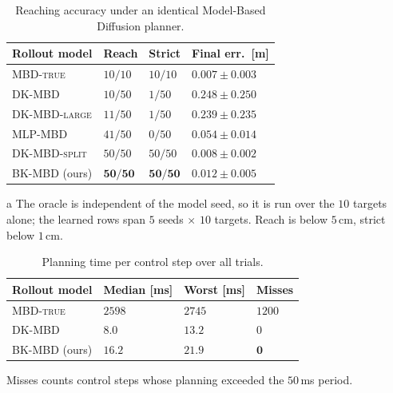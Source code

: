 \documentclass[letterpaper,10pt,conference]{ieeeconf}
\newcommand{\mbdtrue}{\textsc{MBD-true}}
\newcommand{\dkmbd}{\textsc{DK-MBD}}
\newcommand{\dksplit}{\textsc{DK-MBD-split}}
\newcommand{\bkmbd}{\textsc{BK-MBD}}
\begin{document}
\begin{table}[t]
\centering
\begin{threeparttable}
\caption{Reaching accuracy under an identical Model-Based Diffusion planner.}
\label{tab:franka}
\footnotesize
\setlength{\tabcolsep}{4pt}
\begin{tabularx}{\linewidth}{l Y Y Y}
\toprule
Rollout model & Reach & Strict & Final err.\ [m] \\
\midrule
\mbdtrue{} & $10/10$ & $10/10$ & $0.007{\pm}0.003$ \\
\dkmbd{} & $10/50$ & $1/50$ & $0.248{\pm}0.250$ \\
\textsc{DK-MBD-large} & $11/50$ & $1/50$ & $0.239{\pm}0.235$ \\
\textsc{MLP-MBD} & $41/50$ & $0/50$ & $0.054{\pm}0.014$ \\
\dksplit{} & $50/50$ & $50/50$ & $0.008{\pm}0.002$ \\
\bkmbd{} (ours) & $\mathbf{50/50}$ & $\mathbf{50/50}$ & $\mathbf{0.012{\pm}0.005}$ \\
\bottomrule
\end{tabularx}
\begin{tablenotes}[flushleft]\scriptsize
\item[a] The oracle is independent of the model seed, so it is run over the
$10$ targets alone; the learned rows span $5$ seeds $\times$ $10$ targets.
Reach is below $5$\,cm, strict below $1$\,cm.
\end{tablenotes}
\end{threeparttable}
\end{table}

\begin{table}[t]
\centering
\begin{threeparttable}
\caption{Planning time per control step over all trials.}
\label{tab:latency}
\footnotesize
\begin{tabularx}{\linewidth}{l Y Y Y}
\toprule
Rollout model & Median [ms] & Worst [ms] & Misses \\
\midrule
\mbdtrue{} & $2598$ & $2745$ & $1200$ \\
\dkmbd{} & $8.0$ & $13.2$ & $0$ \\
\bkmbd{} (ours) & $\mathbf{16.2}$ & $\mathbf{21.9}$ & $\mathbf{0}$ \\
\bottomrule
\end{tabularx}
\begin{tablenotes}[flushleft]\scriptsize
\item Misses counts control steps whose planning exceeded the $50$\,ms period.
\end{tablenotes}
\end{threeparttable}
\end{table}
\end{document}
